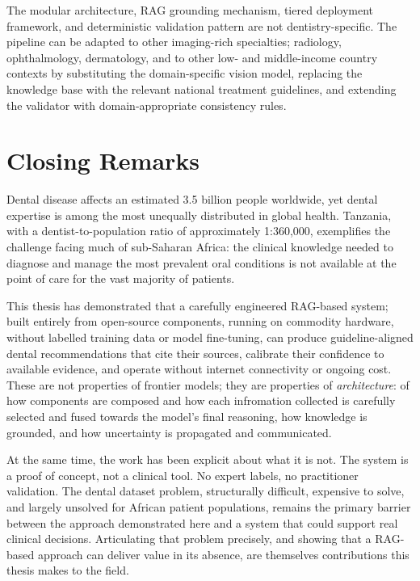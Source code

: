 \documentclass[12pt,a4paper]{report}
\begin{document}
The modular architecture, RAG grounding mechanism, tiered deployment framework,
and deterministic validation pattern are not dentistry-specific. The pipeline
can be adapted to other imaging-rich specialties; radiology, ophthalmology,
dermatology, and to other low- and middle-income country contexts by
substituting the domain-specific vision model, replacing the knowledge base
with the relevant national treatment guidelines, and extending the validator
with domain-appropriate consistency rules.

\section{Closing Remarks}
\label{sec:conclusion_closing}

Dental disease affects an estimated 3.5 billion people worldwide, yet dental
expertise is among the most unequally distributed in global health. Tanzania,
with a dentist-to-population ratio of approximately 1:360,000, exemplifies
the challenge facing much of sub-Saharan Africa: the clinical knowledge needed
to diagnose and manage the most prevalent oral conditions is not available at
the point of care for the vast majority of patients.

This thesis has demonstrated that a carefully engineered RAG-based system;
built entirely from open-source components, running on commodity hardware,
without labelled training data or model fine-tuning, can produce
guideline-aligned dental recommendations that cite their sources, calibrate
their confidence to available evidence, and operate without internet connectivity
or ongoing cost. These are not properties of frontier models; they are properties
of \emph{architecture}: of how components are composed and how each infromation collected is carefully selected and fused towards the model's final reasoning, how knowledge is
grounded, and how uncertainty is propagated and communicated.

At the same time, the work has been explicit about what it is not. The system
is a proof of concept, not a clinical tool. No expert
labels, no practitioner validation. The dental dataset problem, structurally
difficult, expensive to solve, and largely unsolved for African patient
populations, remains the primary barrier between the approach demonstrated
here and a system that could support real clinical decisions. Articulating
that problem precisely, and showing that a RAG-based approach can deliver value
in its absence, are themselves contributions this thesis makes to the field.
\end{document}
